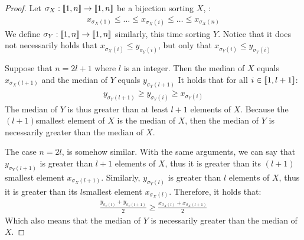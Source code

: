 \begin{proof}
    Let $\sigma_X:[\![1,n]\!]\rightarrow[\![1,n]\!]$ be a bijection sorting $X$, \ie:
    \begin{align}
        x_{\sigma_X(1)}\leqslant\dots\leqslant x_{\sigma_X(i)}\leqslant\dots\leqslant x_{\sigma_X(n)}
    \end{align}
    We define $\sigma_Y:[\![1,n]\!]\rightarrow[\![1,n]\!]$ similarly, this time sorting $Y$. Notice that it does not necessarily holds that $x_{\sigma_X(i)}\leqslant y_{\sigma_Y(i)}$, but only that $x_{\sigma_Y(i)}\leqslant y_{\sigma_Y(i)}$ 
    
    Suppose that $n=2l+1$ where $l$ is an integer. Then the median of $X$ equals $x_{\sigma_X(l+1)}$ and the median of $Y$ equals $y_{\sigma_Y(l+1)}$ 
    It holds that for all $i\in[\![1,l+1]\!]$:
    \begin{align}
        y_{\sigma_Y(l+1)}\geqslant y_{\sigma_Y(i)}\geqslant x_{\sigma_Y(i)}
    \end{align}
    The median of $Y$ is thus greater than at least $l+1$ elements of $X$. Because the $(l+1)$\ith smallest element of $X$ is the median of $X$, then the median of $Y$ is necessarily greater than the median of $X$.
    
    The case $n=2l$, is somehow similar. With the same arguments, we can say that $y_{\sigma_Y(l+1)}$ is greater than $l+1$ elements of $X$, thus it is greater than its $(l+1)$\ith smallest element $x_{\sigma_X(l+1)}$. Similarly, $y_{\sigma_Y(l)}$ is greater than $l$ elements of $X$, thus it is greater than its $l$\ith smallest element $x_{\sigma_X(l)}$. Therefore, it holds that:
    \begin{align}
        \frac{y_{\sigma_Y(l)}+y_{\sigma_Y(l+1)}}{2}\geqslant\frac{x_{\sigma_X(l)}+x_{\sigma_X(l+1)}}{2}
    \end{align}
    Which also means that the median of $Y$ is necessarily greater than the median of $X$.
\end{proof}

